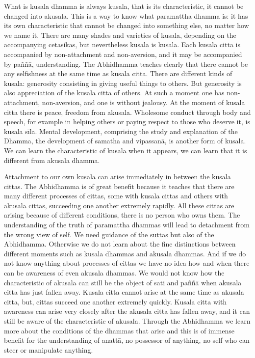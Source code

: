 What is kusala dhamma is always kusala, that is its characteristic, it cannot be changed into akusala. This is a way to know what paramattha dhamma is: it has its own characteristic that cannot be changed into something else, no matter how we name it.
There are many shades and varieties of kusala, depending on the accompanying cetasikas, but nevertheless kusala is kusala. Each kusala citta is accompanied by non-attachment and non-aversion, and it may be accompanied by paññā, understanding. The Abhidhamma teaches clearly that there cannot be any selfishness at the same time as kusala citta. There are different kinds of kusala: generosity consisting in giving useful things to others. But generosity is also appreciation of the kusala citta of others. At such a moment one has non-attachment, non-aversion, and one is without jealousy. At the moment of kusala citta there is peace, freedom from akusala. Wholesome conduct through body and speech, for example in helping others or paying respect to those who deserve it, is kusala sīla. Mental development, comprising the study and explanation of the Dhamma, the development of samatha and vipassanā, is another form of kusala. We can learn the characteristic of kusala when it appears, we can learn that it is different from akusala dhamma.

Attachment to our own kusala can arise immediately in between the kusala cittas. The Abhidhamma is of great benefit because it teaches that there are many different processes of cittas, some with kusala cittas and others with akusala cittas, succeeding one another extremely rapidly. All these cittas are arising because of different conditions, there is no person who owns them. The understanding of the truth of paramattha dhammas will lead to detachment from the wrong view of self.
We need guidance of the suttas but also of the Abhidhamma. Otherwise we do not learn about the fine distinctions between different moments such as kusala dhammas and akusala dhammas. And if we do not know anything about processes of cittas we have no idea how and when there can be awareness of even akusala dhammas. We would not know how the characteristic of akusala can still be the object of sati and paññā when akusala citta has just fallen away. Kusala citta cannot arise at the same time as akusala citta, but, cittas succeed one another extremely quickly. Kusala citta with awareness can arise very closely after the akusala citta has fallen away, and it can still be aware of the characteristic of akusala. Through the Abhidhamma we learn more about the conditions of the dhammas that arise and this is of immense benefit for the understanding of anattā, no possessor of anything, no self who can steer or manipulate anything.

